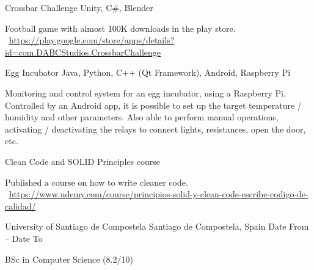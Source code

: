 \documentclass[]{awesome-cv}
\begin{document}
\begin{cventries}
	\vspace{-3mm}
	\cventry
	{}
	{Crossbar Challenge \vspace{-5mm}}
	{Unity, C\#, Blender \vspace{-5mm}}
	{}
	{\begin{cvsectionnormaltext}
		\item {Football game with almost 100K downloads in the play store. 
		\newline \faLink\ \href{https://play.google.com/store/apps/details?id=com.DABCStudios.CrossbarChallenge}{https://play.google.com/store/apps/details?id=com.DABCStudios.CrossbarChallenge}}
	\end{cvsectionnormaltext}}

	\vspace{-3mm}
	\cventry
	{}
	{Egg Incubator \vspace{-5mm}}
	{Java, Python, C++ (Qt Framework), Android, Raspberry Pi \vspace{-5mm}}
	{}
	{\begin{cvsectionnormaltext}
		\item{Monitoring and control system for an egg incubator, using a Raspberry Pi. Controlled by an Android app, it is possible to set up the target temperature / humidity and other parameters. Also able to perform manual operations, activating / deactivating the relays to connect lights, resistances, open the door, etc.}
	\end{cvsectionnormaltext}}	
	
	\vspace{-3mm}
	\cventry
	{}
	{Clean Code and SOLID Principles course \vspace{-5mm}}
	{}
	{}
	{\begin{cvsectionnormaltext}
		\item{Published a course on how to write cleaner code.
		\newline \faLink\ \href{https://www.udemy.com/course/principios-solid-y-clean-code-escribe-codigo-de-calidad/}{https://www.udemy.com/course/principios-solid-y-clean-code-escribe-codigo-de-calidad/}}
	\end{cvsectionnormaltext}}
	
	\vspace{-5mm}
	
\end{cventries}

\vspace{8mm}
\begin{cventries}
	\vspace{-3mm}
	\cventry
	{}
	{University of Santiago de Compostela \vspace{-5mm}}
	{Santiago de Compostela, Spain \vspace{-5mm}}
	{Date From – Date To \vspace{-5mm}}
	{\begin{cvsectionnormaltext} 
		\item{BSc in Computer Science (8.2/10)}
	\end{cvsectionnormaltext}}
\end{cventries}
\end{document}
